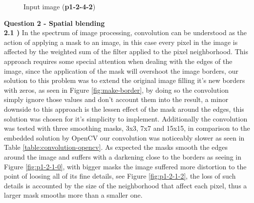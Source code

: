 \documentclass[12pt,a4paper]{article}
\begin{document}
\begin{figure}[!h]
	\centering
	{%
		\setlength{\fboxsep}{1pt}%
		\setlength{\fboxrule}{1pt}%
	}%
	\caption{Input image (\textbf{p1-2-4-2})}
	\label{fig:p1-2-4-2}
\end{figure}

\textbf{Question 2 - Spatial blending}\\

\textbf{2.1 )} In the spectrum of image processing, convolution can be understood as the action of applying a mask to an image, in this case every pixel in the image is affected by the weighted sum of the filter applied to the pixel neighborhood. This approach requires some special attention when dealing with the edges of the image, since the application of the mask will overshoot the image borders, our solution to this problem was to extend the original image filling it's new borders with zeros, as seen in Figure \ref{fig:make-border}, by doing so the convolution simply ignore those values and don't account them into the result, a minor downside to this approach is the lessen effect of the mask around the edges, this solution was chosen for it's simplicity to implement. Additionally the convolution was tested with three smoothing masks, 3x3, 7x7 and 15x15, in comparison to the embedded solution by OpenCV our convolution was noticeably slower as seen in Table \ref{table:convolution-opencv}. As expected the masks smooth the edges around the image and suffers with a darkening close to the borders as seeing in Figure \ref{fig:p1-2-1-0}, with bigger masks the image suffered more distortion to the point of loosing all of its fine details, see Figure \ref{fig:p1-2-1-2}, the loss of such details is accounted by the size of the neighborhood that affect each pixel, thus a larger mask smooths more than a smaller one.\\
\end{document}
